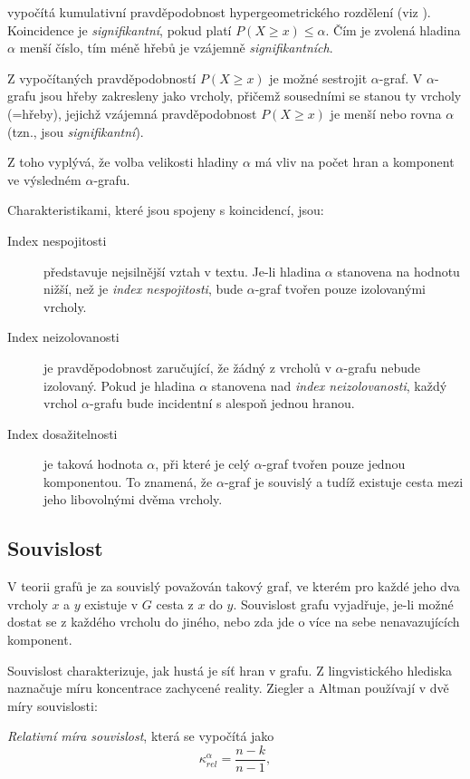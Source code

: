 \documentclass[dp.tex]{subfiles}
\begin{document}
vypočítá kumulativní pravděpodobnost hypergeometrického rozdělení (viz \cite[str. 307]{Wimmer2003}). Koincidence je \textit{signifikantní}, pokud platí $P(X \geq x)\leq \alpha$. Čím je zvolená hladina $\alpha$ menší číslo, tím méně hřebů je vzájemně \textit{signifikantních}.

Z vypočítaných pravděpodobností $P(X \geq x)$ je možné sestrojit $\alpha$-graf. V $\alpha$-grafu jsou hřeby zakresleny jako vrcholy, přičemž sousedními se stanou ty vrcholy (=hřeby), jejichž vzájemná pravděpodobnost $P(X \geq x)$ je menší nebo rovna $\alpha$ (tzn., jsou \textit{signifikantní}).

Z toho vyplývá, že volba velikosti hladiny $\alpha$ má vliv na počet hran a komponent ve výsledném $\alpha$-grafu. 

Charakteristikami, které jsou spojeny s koincidencí, jsou:
\begin{description}
	\item[Index nespojitosti] představuje nejsilnější vztah v textu. Je-li hladina $\alpha$ stanovena na hodnotu nižší, než je \textit{index nespojitosti}, bude $\alpha$-graf tvořen pouze izolovanými vrcholy.
	\item[Index neizolovanosti] je pravděpodobnost zaručující, že žádný z vrcholů v $\alpha$-grafu nebude izolovaný. Pokud je hladina $\alpha$ stanovena nad \textit{index neizolovanosti}, každý vrchol $\alpha$-grafu bude incidentní s alespoň jednou hranou.
	\item[Index dosažitelnosti] je taková hodnota $\alpha$, při které je celý $\alpha$-graf tvořen pouze jednou komponentou. To znamená, že $\alpha$-graf je souvislý a tudíž existuje cesta mezi jeho libovolnými dvěma vrcholy.
\end{description}

\subsection{Souvislost}
V teorii grafů je za souvislý považován takový graf, ve kterém pro každé jeho dva vrcholy $x$ a $y$ existuje v $G$ cesta z $x$ do $y$. Souvislost grafu vyjadřuje, je-li možné dostat se z každého vrcholu do jiného, nebo zda jde o více na sebe nenavazujících komponent.

Souvislost charakterizuje, jak hustá je síť hran v grafu. Z lingvistického hlediska naznačuje míru koncentrace zachycené reality. Ziegler a Altman používají v \cite{ZieglerAltmann2002} dvě míry souvislosti:

\textit{Relativní míra souvislost}, která se vypočítá jako
\begin{equation}
\kappa_\textit{rel}^\alpha=\frac{n-k}{n-1},
\end{equation}
\end{document}
